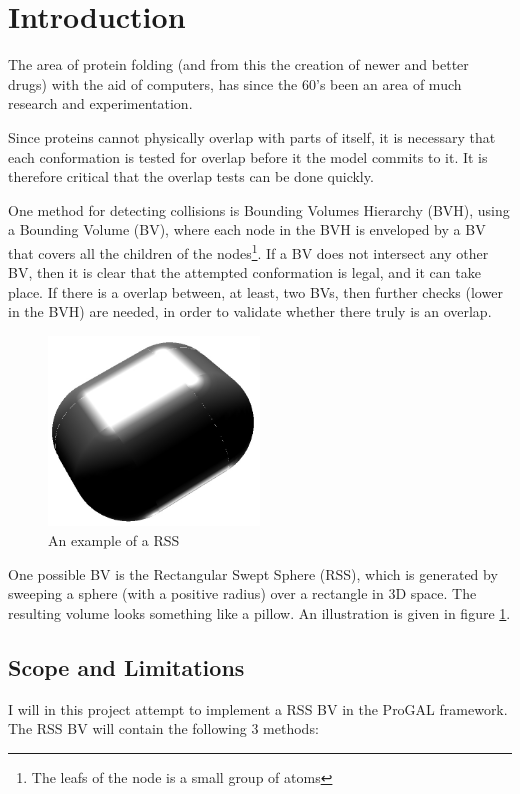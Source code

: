 
\section{Introduction}
\label{introduction}

The area of protein folding (and from this the creation of newer and better drugs) with the aid of computers, has since the 60's been an area of much research and experimentation. 

Since proteins cannot physically overlap with parts of itself, it is necessary that each conformation is tested for overlap before it the model commits to it. It is therefore critical that the overlap tests can be done quickly.

One method for detecting collisions is Bounding Volumes Hierarchy (BVH), using a Bounding Volume (BV), where each node in the BVH is enveloped by a BV that covers all the children of the nodes\footnote{The leafs of the node is a small group of atoms}. If a BV does not intersect any other BV, then it is clear that the attempted conformation is legal, and it can take place. If there is a overlap between, at least, two BVs, then further checks (lower in the BVH) are needed, in order to validate whether there truly is an overlap.

\begin{figure}
\centering
\includegraphics[width=0.5\textwidth]{figures/rss}
\caption{\label{rss-example-figure}An example of a RSS}
\end{figure}

One possible BV is the Rectangular Swept Sphere (RSS), which is generated by sweeping a sphere (with a positive radius) over a rectangle in 3D space. The resulting volume looks something like a pillow. An illustration is given in figure \ref{rss-example-figure}. 

\subsection{Scope and Limitations}
\label{scope}
I will in this project attempt to implement a RSS BV in the ProGAL framework. The RSS BV will contain the following 3 methods:


